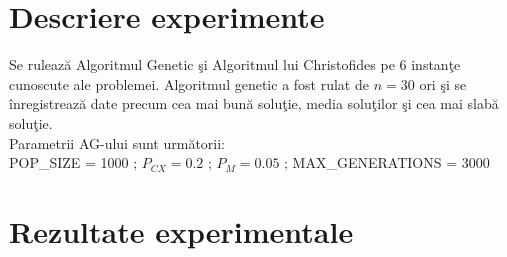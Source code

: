 \documentclass[11pt,leqno]{article}
\begin{document}
\section{Descriere experimente}

\begin{flushleft}
Se ruleaz\u a Algoritmul Genetic \c si Algoritmul lui Christofides pe 6 instan\c te cunoscute ale problemei. Algoritmul genetic a fost  rulat de $n=30$ ori \c si se \^ inregistreaz\u a date precum cea mai bun\u a solu\c tie, media solu\c tilor \c si cea mai slab\u a solu\c tie.\\
Parametrii AG-ului sunt urm\u atorii:\\
POP\_SIZE = 1000 ; $P_{CX} = 0.2$ ; $P_{M} = 0.05$ ; MAX\_GENERATIONS = 3000

\end{flushleft}

\section{Rezultate experimentale}
\end{document}
